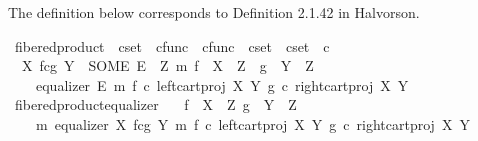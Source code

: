 \begin{isabellebody}
%
\endisadelimdocument
%
\begin{isamarkuptext}%
The definition below corresponds to Definition 2.1.42 in Halvorson.%
\end{isamarkuptext}\isamarkuptrue%
\isamarkupfalse%
\ fibered{\isacharunderscore}{\kern0pt}product\ {\isacharcolon}{\kern0pt}{\isacharcolon}{\kern0pt}\ {\isachardoublequoteopen}cset\ {\isasymRightarrow}\ cfunc\ {\isasymRightarrow}\ cfunc\ {\isasymRightarrow}\ cset\ {\isasymRightarrow}\ cset{\isachardoublequoteclose}\ {\isacharparenleft}{\kern0pt}{\isachardoublequoteopen}{\isacharunderscore}{\kern0pt}\ \isactrlbsub {\isacharunderscore}{\kern0pt}\isactrlesub {\isasymtimes}\isactrlsub c\isactrlbsub {\isacharunderscore}{\kern0pt}\isactrlesub \ {\isacharunderscore}{\kern0pt}{\isachardoublequoteclose}\ {\isacharbrackleft}{\kern0pt}{}{}{\isacharcomma}{\kern0pt}{}{}{\isacharcomma}{\kern0pt}{}{}{\isacharcomma}{\kern0pt}{}{}{\isacharbrackright}{\kern0pt}{}{}{\isacharparenright}{\kern0pt}\ \isanewline
\ \ {\isachardoublequoteopen}X\ \isactrlbsub f\isactrlesub {\isasymtimes}\isactrlsub c\isactrlbsub g\isactrlesub \ Y\ {\isacharequal}{\kern0pt}\ {\isacharparenleft}{\kern0pt}SOME\ E{\isachardot}{\kern0pt}\ {\isasymexists}\ Z\ m{\isachardot}{\kern0pt}\ f\ {\isacharcolon}{\kern0pt}\ X\ {\isasymrightarrow}\ Z\ {\isasymand}\ g\ {\isacharcolon}{\kern0pt}\ Y\ {\isasymrightarrow}\ Z\ {\isasymand}\isanewline
\ \ \ \ equalizer\ E\ m\ {\isacharparenleft}{\kern0pt}f\ {\isasymcirc}\isactrlsub c\ left{\isacharunderscore}{\kern0pt}cart{\isacharunderscore}{\kern0pt}proj\ X\ Y{\isacharparenright}{\kern0pt}\ {\isacharparenleft}{\kern0pt}g\ {\isasymcirc}\isactrlsub c\ right{\isacharunderscore}{\kern0pt}cart{\isacharunderscore}{\kern0pt}proj\ X\ Y{\isacharparenright}{\kern0pt}{\isacharparenright}{\kern0pt}{\isachardoublequoteclose}\isanewline
\isanewline
{}\isamarkupfalse%
\ fibered{\isacharunderscore}{\kern0pt}product{\isacharunderscore}{\kern0pt}equalizer{\isacharcolon}{\kern0pt}\isanewline
\ \ \ {\isachardoublequoteopen}f\ {\isacharcolon}{\kern0pt}\ X\ {\isasymrightarrow}\ Z{\isachardoublequoteclose}\ {\isachardoublequoteopen}g\ {\isacharcolon}{\kern0pt}\ Y\ {\isasymrightarrow}\ Z{\isachardoublequoteclose}\isanewline
\ \ \ {\isachardoublequoteopen}{\isasymexists}\ m{\isachardot}{\kern0pt}\ equalizer\ {\isacharparenleft}{\kern0pt}X\ \isactrlbsub f\isactrlesub {\isasymtimes}\isactrlsub c\isactrlbsub g\isactrlesub \ Y{\isacharparenright}{\kern0pt}\ m\ {\isacharparenleft}{\kern0pt}f\ {\isasymcirc}\isactrlsub c\ left{\isacharunderscore}{\kern0pt}cart{\isacharunderscore}{\kern0pt}proj\ X\ Y{\isacharparenright}{\kern0pt}\ {\isacharparenleft}{\kern0pt}g\ {\isasymcirc}\isactrlsub c\ right{\isacharunderscore}{\kern0pt}cart{\isacharunderscore}{\kern0pt}proj\ X\ Y{\isacharparenright}{\kern0pt}{\isachardoublequoteclose}\isanewline

\end{isabellebody}
